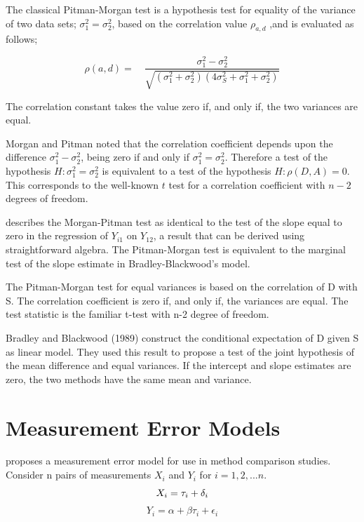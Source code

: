 \documentclass[12pt, a4paper]{report}
\theoremstyle{plain}
\theoremstyle{definition}
\theoremstyle{remark}
\begin{document}
The classical Pitman-Morgan test is a hypothesis test for equality of the variance of two data sets; $\sigma^{2}_{1} =
\sigma^{2}_{2}$, based on the correlation value $\rho_{a,d}$ ,and is evaluated as follows;

\begin{equation}
\rho(a,d)=\quad\frac{\sigma^{2}_{1}-\sigma^{2}_{2}}{\sqrt{(\sigma^{2}_{1}+\sigma^{2}_{2})(4\sigma^{2}_{S}+\sigma^{2}_{1}+\sigma^{2}_{2})}}
\end{equation}

The correlation constant takes the value zero if, and only if, the
two variances are equal. 

Morgan and Pitman noted that the correlation coefficient depends
upon the difference $\sigma^{2}_{1}- \sigma^{2}_{2}$, being zero
if and only if $\sigma^{2}_{1}=\sigma^{2}_{2}$.
Therefore a test of the hypothesis $H: \sigma^{2}_{1}=\sigma^{2}_{2}$ is equivalent to a test of the hypothesis $H: \rho(D,A) = 0$. This corresponds to the well-known $t$ test for a correlation coefficient with $n-2$ degrees of freedom. 


\citet{Bartko} describes the Morgan-Pitman test as identical to the test of the slope equal to zero in the regression of $Y_{i1}$ on $Y_{12}$, a result that can be derived using straightforward algebra. The Pitman-Morgan test is equivalent to the marginal test of the slope estimate in Bradley-Blackwood’s model.






The Pitman-Morgan test for equal variances is based on the correlation of D with S. The correlation coefficient is zero if, and only if, the variances are equal. The test statistic is the familiar t-test with n-2 degree of freedom.

Bradley and Blackwood (1989) construct the conditional expectation of D given S as linear model.  They used this result to propose a test of the joint hypothesis of the mean difference and equal variances. 
If the intercept and slope estimates are zero, the two methods have the same mean and variance.







\section{Measurement Error Models}
\citet{DunnSEME} proposes a measurement error model for use in
method comparison studies. Consider n pairs of measurements
$X_{i}$ and $Y_{i}$ for $i=1,2,...n$.
\begin{equation}
X_{i} = \tau_{i}+\delta_{i}\\
\end{equation}
\begin{equation}
Y_{i} = \alpha +\beta\tau_{i}+\epsilon_{i} \nonumber
\end{equation}
\end{document}
